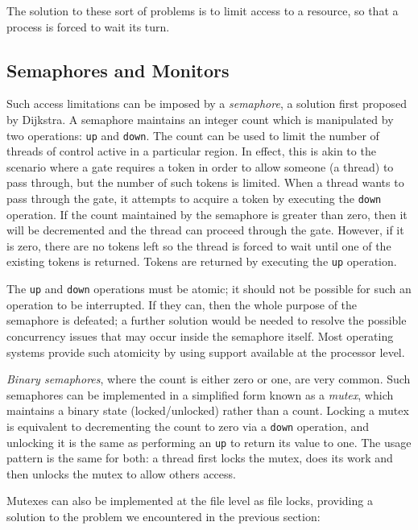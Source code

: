 The solution to these sort of problems is to limit access to a
resource, so that a process is forced to wait its turn.

\subsection{Semaphores and Monitors}
\label{semaphores}

Such access limitations can be imposed by a \emph{semaphore}, a
solution first proposed by Dijkstra\cite{semaphore}.  A semaphore
maintains an integer count which is manipulated by two operations: \texttt{up}
and \texttt{down}.  The count can be used to limit the number of threads of
control active in a particular region.  In effect, this is akin to the
scenario where a gate requires a token in order to allow someone (a
thread) to pass through, but the number of such tokens is limited.
When a thread wants to pass through the gate, it attempts to acquire a
token by executing the \texttt{down} operation.  If the count maintained by
the semaphore is greater than zero, then it will be decremented and
the thread can proceed through the gate.  However, if it is zero,
there are no tokens left so the thread is forced to wait until one of
the existing tokens is returned.  Tokens are returned by executing the
\texttt{up} operation.

The \texttt{up} and \texttt{down} operations must be atomic; it should not be possible
for such an operation to be interrupted.  If they can, then the whole
purpose of the semaphore is defeated; a further solution would be
needed to resolve the possible concurrency issues that may occur
inside the semaphore itself.  Most operating systems provide such
atomicity by using support available at the processor level.

\emph{Binary semaphores}, where the count is either zero or one, are
very common.  Such semaphores can be implemented in a simplified form
known as a \emph{mutex}, which maintains a binary state
(locked/unlocked) rather than a count.  Locking a mutex is equivalent
to decrementing the count to zero via a \texttt{down} operation, and unlocking
it is the same as performing an \texttt{up} to return its value to one.  The
usage pattern is the same for both: a thread first locks the mutex,
does its work and then unlocks the mutex to allow others access.

Mutexes can also be implemented at the file level as file locks,
providing a solution to the problem we encountered in the previous
section:

